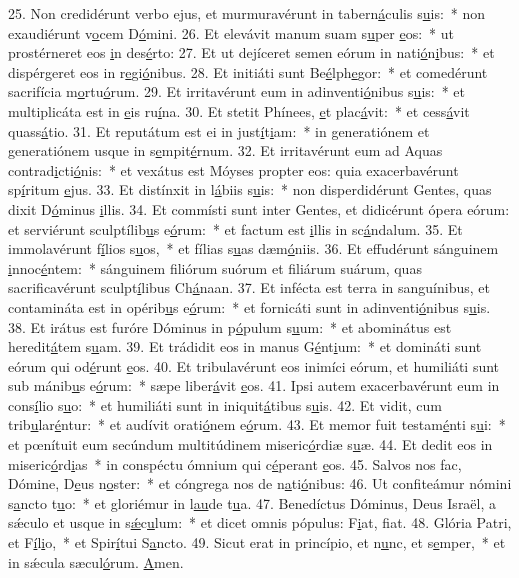 25. Non credidérunt verbo ejus, et murmuravérunt in tabern\uline{á}culis s\uline{u}is:~* non exaudiérunt v\uline{o}cem D\uline{ó}mini.
26. Et elevávit manum suam s\uline{u}per \uline{e}os:~* ut prostérneret eos \uline{i}n des\uline{é}rto:
27. Et ut dejíceret semen eórum in nati\uline{ó}n\uline{i}bus:~* et dispérgeret eos in r\uline{e}gi\uline{ó}nibus.
28. Et initiáti sunt Be\uline{é}lph\uline{e}gor:~* et comedérunt sacrifícia m\uline{o}rtu\uline{ó}rum.
29. Et irritavérunt eum in adinventi\uline{ó}nibus s\uline{u}is:~* et multiplicáta est in \uline{e}is ru\uline{í}na.
30. Et stetit Phínees, \uline{e}t plac\uline{á}vit:~* et cess\uline{á}vit quass\uline{á}tio.
31. Et reputátum est ei in just\uline{í}t\uline{i}am:~* in generatiónem et generatiónem usque in s\uline{e}mpit\uline{é}rnum.
32. Et irritavérunt eum ad Aquas contrad\uline{i}cti\uline{ó}nis:~* et vexátus est Móyses propter eos: quia exacerbavérunt sp\uline{í}ritum \uline{e}jus.
33. Et distínxit in l\uline{á}biis s\uline{u}is:~* non disperdidérunt Gentes, quas dixit D\uline{ó}minus \uline{i}llis.
34. Et commísti sunt inter Gentes, et didicérunt ópera eórum: et serviérunt sculptílib\uline{u}s e\uline{ó}rum:~* et factum est \uline{i}llis in sc\uline{á}ndalum.
35. Et immolavérunt f\uline{í}lios s\uline{u}os,~* et fílias s\uline{u}as dæm\uline{ó}niis.
36. Et effudérunt sánguinem \uline{i}nnoc\uline{é}ntem:~* sánguinem filiórum suórum et filiárum suárum, quas sacrificavérunt sculpt\uline{í}libus Ch\uline{á}naan.
37. Et infécta est terra in sanguínibus, et contamináta est in opérib\uline{u}s e\uline{ó}rum:~* et fornicáti sunt in adinventi\uline{ó}nibus s\uline{u}is.
38. Et irátus est furóre Dóminus in p\uline{ó}pulum s\uline{u}um:~* et abominátus est heredit\uline{á}tem s\uline{u}am.
39. Et trádidit eos in manus G\uline{é}nt\uline{i}um:~* et domináti sunt eórum qui od\uline{é}runt \uline{e}os.
40. Et tribulavérunt eos inimíci eórum, et humiliáti sunt sub mánib\uline{u}s e\uline{ó}rum:~* sæpe liber\uline{á}vit \uline{e}os.
41. Ipsi autem exacerbavérunt eum in cons\uline{í}lio s\uline{u}o:~* et humiliáti sunt in iniquit\uline{á}tibus s\uline{u}is.
42. Et vidit, cum trib\uline{u}lar\uline{é}ntur:~* et audívit orati\uline{ó}nem e\uline{ó}rum.
43. Et memor fuit testam\uline{é}nti s\uline{u}i:~* et pœnítuit eum secúndum multitúdinem miseric\uline{ó}rdiæ s\uline{u}æ.
44. Et dedit eos in miseric\uline{ó}rd\uline{i}as~* in conspéctu ómnium qui c\uline{é}perant \uline{e}os.
45. Salvos nos fac, Dómine, D\uline{e}us n\uline{o}ster:~* et cóngrega nos de n\uline{a}ti\uline{ó}nibus:
46. Ut confiteámur nómini s\uline{a}ncto t\uline{u}o:~* et gloriémur in l\uline{au}de t\uline{u}a.
47. Benedíctus Dóminus, Deus Israël, a sǽculo et usque in s\uline{ǽ}c\uline{u}lum:~* et dicet omnis pópulus: F\uline{i}at, f\uline{i}at.
48. Glória Patri, et F\uline{í}l\uline{i}o,~* et Spir\uline{í}tui S\uline{a}ncto.
49. Sicut erat in princípio, et n\uline{u}nc, et s\uline{e}mper,~* et in sǽcula sæcul\uline{ó}rum. \uline{A}men.
